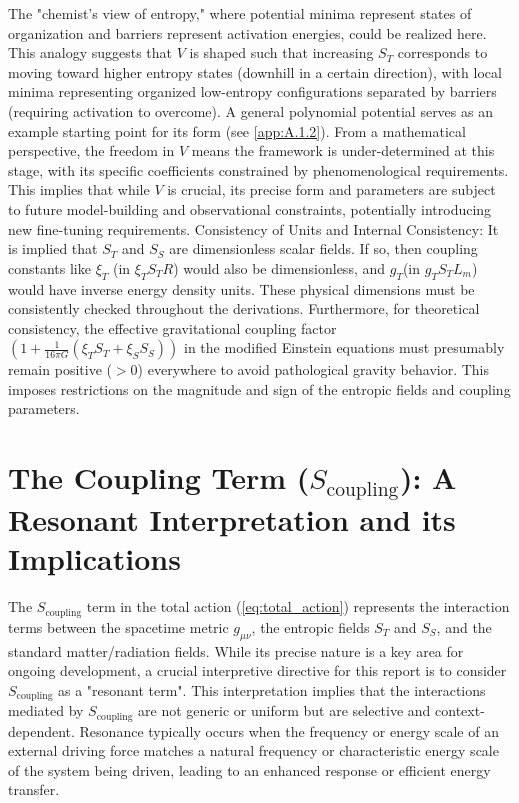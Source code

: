 \documentclass[11pt,a4paper]{article} %
\newcommand{\ST}{S_T}
\newcommand{\SSp}{S_S} %
\newcommand{\Scoupling}{S_{\text{coupling}}}
\newcommand{\Lm}{L_m}
\begin{document}
The "chemist's view of entropy," where potential minima represent states of organization and barriers represent activation energies, could be realized here. This analogy suggests that $V$ is shaped such that increasing $\ST$ corresponds to moving toward higher entropy states (downhill in a certain direction), with local minima representing organized low-entropy configurations separated by barriers (requiring activation to overcome). A general polynomial potential serves as an example starting point for its form (see \cref{app:A.1.2}). From a mathematical perspective, the freedom in $V$ means the framework is under-determined at this stage, with its specific coefficients constrained by phenomenological requirements. This implies that while $V$ is crucial, its precise form and parameters are subject to future model-building and observational constraints, potentially introducing new fine-tuning requirements. Consistency of Units and Internal Consistency: It is implied that $\ST$ and $\SSp$ are dimensionless scalar fields. If so, then coupling constants like $\xi_T$ (in $\xi_T\ST R$) would also be dimensionless, and $g_T$(in $g_T\ST\Lm$) would have inverse energy density units. These physical dimensions must be consistently checked throughout the derivations. Furthermore, for theoretical consistency, the effective gravitational coupling factor $(1+\frac{1}{16\pi G}(\xi_T\ST+\xi_S\SSp))$ in the modified Einstein equations must presumably remain positive ($>0$) everywhere to avoid pathological gravity behavior. This imposes restrictions on the magnitude and sign of the entropic fields and coupling parameters.

\section{The Coupling Term ($\Scoupling$): A Resonant Interpretation and its Implications}
The $\Scoupling$ term in the total action (\cref{eq:total_action}) represents the interaction terms between the spacetime metric $g_{\mu\nu}$, the entropic fields $\ST$ and $\SSp$, and the standard matter/radiation fields. While its precise nature is a key area for ongoing development, a crucial interpretive directive for this report is to consider $\Scoupling$ as a "resonant term". This interpretation implies that the interactions mediated by $\Scoupling$ are not generic or uniform but are selective and context-dependent. Resonance typically occurs when the frequency or energy scale of an external driving force matches a natural frequency or characteristic energy scale of the system being driven, leading to an enhanced response or efficient energy transfer.
\end{document}
